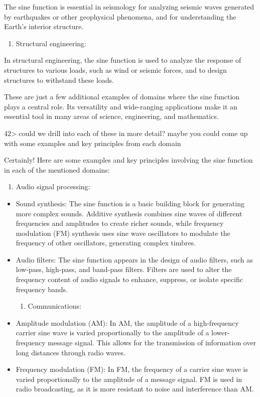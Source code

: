 \documentclass[
]{article}
\providecommand{\tightlist}{%
  \setlength{\itemsep}{0pt}\setlength{\parskip}{0pt}}
\begin{document}
The sine function is essential in seismology for analyzing seismic waves
generated by earthquakes or other geophysical phenomena, and for
understanding the Earth's interior structure.

\begin{enumerate}
\def\labelenumi{\arabic{enumi}.}
\setcounter{enumi}{7}
\tightlist
\item
  Structural engineering:
\end{enumerate}

In structural engineering, the sine function is used to analyze the
response of structures to various loads, such as wind or seismic forces,
and to design structures to withstand these loads.

These are just a few additional examples of domains where the sine
function plays a central role. Its versatility and wide-ranging
applications make it an essential tool in many areas of science,
engineering, and mathematics.

42\textgreater{} could we drill into each of these in more detail? maybe
you could come up with some examples and key principles from each domain

Certainly! Here are some examples and key principles involving the sine
function in each of the mentioned domains:

\begin{enumerate}
\def\labelenumi{\arabic{enumi}.}
\tightlist
\item
  Audio signal processing:
\end{enumerate}

\begin{itemize}
\item
  Sound synthesis: The sine function is a basic building block for
  generating more complex sounds. Additive synthesis combines sine waves
  of different frequencies and amplitudes to create richer sounds, while
  frequency modulation (FM) synthesis uses sine wave oscillators to
  modulate the frequency of other oscillators, generating complex
  timbres.
\item
  Audio filters: The sine function appears in the design of audio
  filters, such as low-pass, high-pass, and band-pass filters. Filters
  are used to alter the frequency content of audio signals to enhance,
  suppress, or isolate specific frequency bands.

  \begin{enumerate}
  \def\labelenumi{\arabic{enumi}.}
  \setcounter{enumi}{1}
  \tightlist
  \item
    Communications:
  \end{enumerate}
\item
  Amplitude modulation (AM): In AM, the amplitude of a high-frequency
  carrier sine wave is varied proportionally to the amplitude of a
  lower-frequency message signal. This allows for the transmission of
  information over long distances through radio waves.
\item
  Frequency modulation (FM): In FM, the frequency of a carrier sine wave
  is varied proportionally to the amplitude of a message signal. FM is
  used in radio broadcasting, as it is more resistant to noise and
  interference than AM.
\end{itemize}
\end{document}
